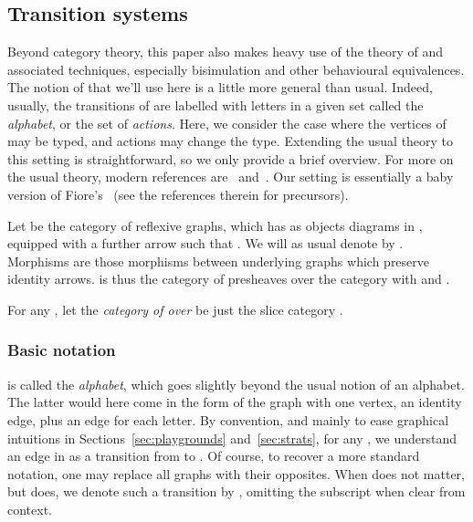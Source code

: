 \documentclass{LMCS}
\theoremstyle{plain}\newtheorem{satz}[thm]{Satz}
\begin{document}
\subsection{Transition systems}\label{subsec:prelim:lts}
Beyond category theory, this paper also makes heavy use of the theory
of \ltss{} and associated techniques, especially bisimulation and
other behavioural equivalences.  The notion of \lts{} that we'll use
here is a little more general than usual. Indeed, usually, the
transitions of \anlts{} are labelled with letters in a given set
called the \emph{alphabet}, or the set of \emph{actions}. Here, we
consider the case where the vertices of \anlts{} may be typed, and
actions may change the type.  Extending the usual theory to this
setting is straightforward, so we only provide a brief overview. For
more on the usual theory, modern references are~\citet{Sangio}
and~\citet{SangioRutten}. Our setting is essentially a baby version of
Fiore's~\cite{DBLP:conf/ifipTCS/Fiore00} (see the references therein
for precursors).

Let  be the category of reflexive graphs, which has as objects
diagrams  in , equipped with a
further arrow  such that . We will as usual denote  by . Morphisms are those
morphisms between underlying graphs which preserve identity arrows.
 is thus the category of presheaves over the category  with  and .
\begin{defi}
  For any , let the \emph{category of \ltss{} over } be
  just the slice category .
\end{defi}

\subsubsection{Basic notation}\label{subsubsec:notation:lts}  is called the \emph{alphabet}, which goes
slightly beyond the usual notion of an alphabet. The latter would here
come in the form of the graph with one vertex, an identity edge, plus
an edge for each letter.  By convention, and mainly to ease graphical
intuitions in Sections~\ref{sec:playgrounds} and~\ref{sec:strats}, for
any \lts{} , we understand an edge  in  as a transition from  to . Of course, to recover a
more standard notation, one may replace all graphs with their
opposites.  When  does not matter, but  does, we denote such
a transition by , omitting the
subscript  when clear from context.
\end{document}
